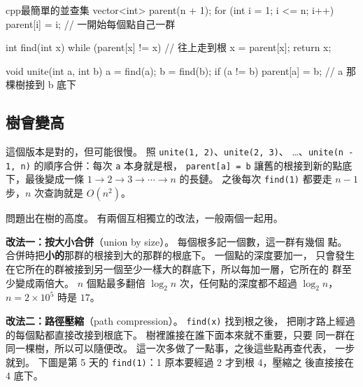 \begin{code}{cpp}{最簡單的並查集}
vector<int> parent(n + 1);
for (int i = 1; i <= n; i++) {
    parent[i] = i;                     // 一開始每個點自己一群
}

int find(int x) {
    while (parent[x] != x) {           // 往上走到根
        x = parent[x];
    }
    return x;
}

void unite(int a, int b) {
    a = find(a);
    b = find(b);
    if (a != b) {
        parent[a] = b;                 // a 那棵樹接到 b 底下
    }
}
\end{code}

\subsection{樹會變高}

這個版本是對的，但可能很慢。 照 \texttt{unite(1, 2)}、\texttt{unite(2, 3)}、
\ldots、\texttt{unite(n - 1, n)} 的順序合併：每次 \texttt{a} 本身就是根，
\texttt{parent[a] = b} 讓舊的根接到新的點底下，最後變成一條
$1 \to 2 \to 3 \to \cdots \to n$ 的長鏈。 之後每次 \texttt{find(1)} 都要走
$n - 1$ 步，$n$ 次查詢就是 $O(n^2)$。

問題出在樹的高度。 有兩個互相獨立的改法，一般兩個一起用。

\textbf{改法一：按大小合併}（union by size）。 每個根多記一個數，這一群有幾個
點。 合併時把\textbf{小的}那群的根接到大的那群的根底下。 一個點的深度要加一，
只會發生在它所在的群被接到另一個至少一樣大的群底下，所以每加一層，它所在的
群至少變成兩倍大。 $n$ 個點最多翻倍 $\log_2 n$ 次，任何點的深度都不超過
$\log_2 n$，$n = 2 \times 10^5$ 時是 $17$。

\textbf{改法二：路徑壓縮}（path compression）。 \texttt{find(x)} 找到根之後，
把剛才路上經過的每個點都直接改接到根底下。 樹裡誰接在誰下面本來就不重要，只要
同一群在同一棵樹，所以可以隨便改。 這一次多做了一點事，之後這些點再查代表，
一步就到。 下圖是第 5 天的 \texttt{find(1)}：1 原本要經過 2 才到根 4，壓縮之
後直接接在 4 底下。

